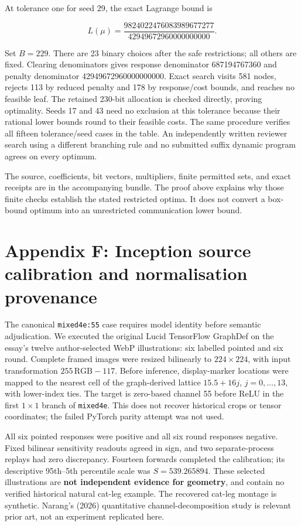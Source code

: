 \documentclass[
  british,
  11pt,
  a4paper,
]{article}
\begin{document}
At tolerance one for seed 29, the exact Lagrange bound is

\[L(\mu)=\frac{9824022476083989677277}{42949672960000000000}.\]

Set \(B=229\). There are 23 binary choices after the safe restrictions;
all others are fixed. Clearing denominators gives response denominator
687194767360 and penalty denominator 42949672960000000000. Exact search
visits 581 nodes, rejects 113 by reduced penalty and 178 by
response/cost bounds, and reaches no feasible leaf. The retained 230-bit
allocation is checked directly, proving optimality. Seeds 17 and 43 need
no exclusion at this tolerance because their rational lower bounds round
to their feasible costs. The same procedure verifies all fifteen
tolerance/seed cases in the table. An independently written reviewer
search using a different branching rule and no submitted suffix dynamic
program agrees on every optimum.

The source, coefficients, bit vectors, multipliers, finite permitted
sets, and exact receipts are in the accompanying bundle. The proof above
explains why those finite checks establish the stated restricted optima.
It does not convert a box-bound optimum into an unrestricted
communication lower bound.

\section{Appendix F: Inception source calibration and normalisation
provenance}\label{appendix-f-inception-source-calibration-and-normalisation-provenance}

The canonical \texttt{mixed4e:55} case requires model identity before
semantic adjudication. We executed the original Lucid TensorFlow
GraphDef on the essay's twelve author-selected WebP illustrations: six
labelled pointed and six round. Complete framed images were resized
bilinearly to \(224\times224\), with input transformation
\(255\,\mathrm{RGB}-117\). Before inference, display-marker locations
were mapped to the nearest cell of the graph-derived lattice
\(15.5+16j\), \(j=0,\ldots,13\), with lower-index ties. The target is
zero-based channel 55 before ReLU in the first \(1\times1\) branch of
\texttt{mixed4e}. This does not recover historical crops or tensor
coordinates; the failed PyTorch parity attempt was not used.

All six pointed responses were positive and all six round responses
negative. Fixed bilinear sensitivity readouts agreed in sign, and two
separate-process replays had zero discrepancy. Fourteen forwards
completed the calibration; its descriptive 95th--5th percentile scale
was \(S=539.265894\). These selected illustrations are \textbf{not
independent evidence for geometry}, and contain no verified historical
natural cat-leg example. The recovered cat-leg montage is synthetic.
Narang's (2026) quantitative channel-decomposition study is relevant
prior art, not an experiment replicated here.
\end{document}

